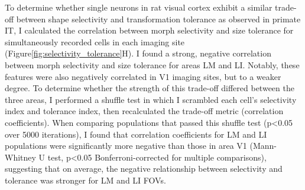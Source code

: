 To determine whether single neurons in rat visual cortex exhibit a similar trade-off between shape selectivity and transformation tolerance as observed in primate IT, I calculated the correlation between morph selectivity and size tolerance for simultaneously recorded cells in each imaging site (Figure\ref{fig:selectivity_tolerance}H). I found a strong, negative correlation between morph selectivity and size tolerance for areas LM and LI. Notably, these features were also negatively correlated in V1 imaging sites, but to a weaker degree. To determine whether the strength of this trade-off differed between the three areas, I performed a shuffle test in which I scrambled each cell’s selectivity index and tolerance index, then recalculated the trade-off metric (correlation coefficients). When comparing populations that passed this shuffle test (p<0.05 over 5000 iterations), I found that correlation coefficients for LM and LI populations were significantly more negative than those in area V1 (Mann-Whitney U test, p<0.05 Bonferroni-corrected for multiple comparisons), suggesting that on average, the negative relationship between selectivity and tolerance was stronger for LM and LI FOVs.


